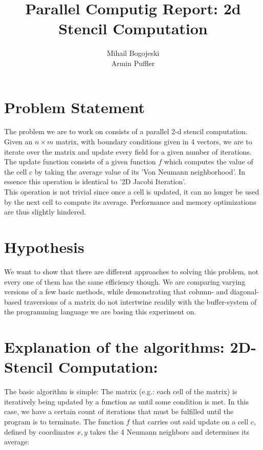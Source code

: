 \documentclass[11pt]{article}
\title{\textbf{Parallel Computig Report: 2d Stencil Computation}}
\author{Mihail Bogojeski\\
		Armin Puffler}
\date{}
\begin{document}
\maketitle

\section{Problem Statement}

The problem we are to work on consists of a parallel 2-d stencil computation.\\
Given an $n \times m$ matrix, with boundary conditions given in 4 vectors, we are to iterate over the matrix and update every field for a given number of iterations.\\ 
The update function consists of a given function $f$ which computes the value of the cell $c$ by taking the average value of its 'Von Neumann neighborhood'. In essence this operation is identical to '2D Jacobi Iteration'.\\
This operation is not trivial since once a cell is updated, it can no longer be used by the next cell to compute its average. Performance and memory optimizations are thus slightly hindered.\\
 
\section{Hypothesis}

We want to show that there are different approaches to solving this problem, not every one of them has the same efficiency though. We are comparing varying versions of a few basic methods, while demonstrating that column- and diagonal-based traversions of a matrix do not intertwine readily with the buffer-system of the programming language we are basing this experiment on.

\section{Explanation of the algorithms: 2D-Stencil Computation: }

The basic algorithm is simple: The matrix (e.g.: each cell of the matrix) is iteratively being updated by a function as until some condition is met. In this case, we have a certain count of iterations that must be fulfilled until the program is to terminate.
The function $f$ that carries out said update on a cell $c$, defined by coordinates $x, y$ takes the 4 Neumann neighbors and determines its average:
\end{document}
